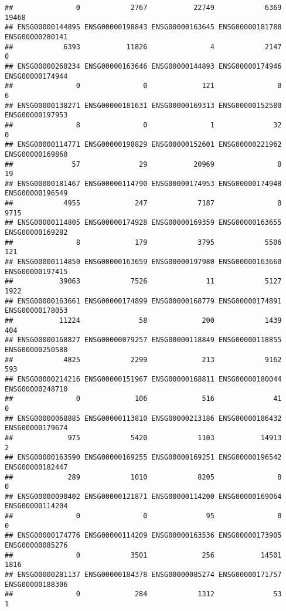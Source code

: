 \documentclass[
]{article}
\begin{document}
\begin{verbatim}
##               0            2767           22749            6369           19468 
## ENSG00000144895 ENSG00000198843 ENSG00000163645 ENSG00000181788 ENSG00000280141 
##            6393           11826               4            2147               0 
## ENSG00000260234 ENSG00000163646 ENSG00000144893 ENSG00000174946 ENSG00000174944 
##               0               0             121               0               6 
## ENSG00000138271 ENSG00000181631 ENSG00000169313 ENSG00000152580 ENSG00000197953 
##               8               0               1              32               0 
## ENSG00000114771 ENSG00000198829 ENSG00000152601 ENSG00000221962 ENSG00000169860 
##              57              29           20969               0              19 
## ENSG00000181467 ENSG00000114790 ENSG00000174953 ENSG00000174948 ENSG00000196549 
##            4955             247            7187               0            9715 
## ENSG00000114805 ENSG00000174928 ENSG00000169359 ENSG00000163655 ENSG00000169282 
##               8             179            3795            5506             121 
## ENSG00000114850 ENSG00000163659 ENSG00000197980 ENSG00000163660 ENSG00000197415 
##           39063            7526              11            5127            1922 
## ENSG00000163661 ENSG00000174899 ENSG00000168779 ENSG00000174891 ENSG00000178053 
##           11224              58             200            1439             404 
## ENSG00000168827 ENSG00000079257 ENSG00000118849 ENSG00000118855 ENSG00000250588 
##            4825            2299             213            9162             593 
## ENSG00000214216 ENSG00000151967 ENSG00000168811 ENSG00000180044 ENSG00000248710 
##               0             106             516              41               0 
## ENSG00000068885 ENSG00000113810 ENSG00000213186 ENSG00000186432 ENSG00000179674 
##             975            5420            1103           14913               2 
## ENSG00000163590 ENSG00000169255 ENSG00000169251 ENSG00000196542 ENSG00000182447 
##             289            1010            8205               0               0 
## ENSG00000090402 ENSG00000121871 ENSG00000114200 ENSG00000169064 ENSG00000114204 
##               0               0              95               0               0 
## ENSG00000174776 ENSG00000114209 ENSG00000163536 ENSG00000173905 ENSG00000085276 
##               0            3501             256           14501            1816 
## ENSG00000281137 ENSG00000184378 ENSG00000085274 ENSG00000171757 ENSG00000188306 
##               0             284            1312              53               1 

\end{verbatim}
\end{document}
